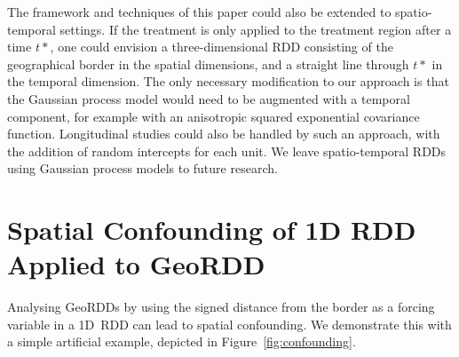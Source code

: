 \documentclass[letter,12pt]{article}
\begin{document}
The framework and techniques of this paper could also be extended to spatio-temporal settings.
If the treatment is only applied to the treatment region after a time \(t*\), one could envision a three-dimensional RDD consisting of the geographical border in the spatial dimensions, and a straight line through \(t*\) in the temporal dimension.
The only necessary modification to our approach is that the Gaussian process model would need to be augmented with a temporal component, for example with an anisotropic squared exponential covariance function.
Longitudinal studies could also be handled by such an approach, with the addition of random intercepts for each unit.
We leave spatio-temporal RDDs using Gaussian process models to future research.



\appendix



\hypertarget{spatial-confounding-of-1d-rdd-applied-to-geordd}{%
\section{Spatial Confounding of 1D RDD Applied to GeoRDD}\label{spatial-confounding-of-1d-rdd-applied-to-geordd}}



\label{sec:confounding}



Analysing GeoRDDs by using the signed distance from the border as a forcing variable in a 1D~RDD can lead to spatial confounding.
We demonstrate this with a simple artificial example, depicted in Figure~\ref{fig:confounding}.
\end{document}
